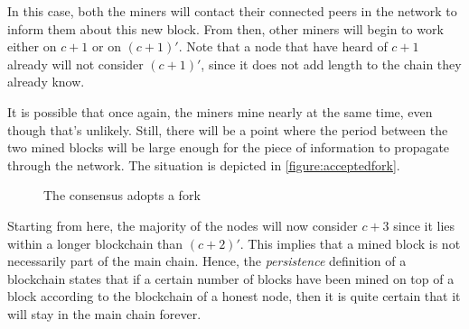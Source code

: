         In this case, both the miners will contact their connected peers in the network to inform them about this new block. From then, other miners will begin to work either on \(c+1\) or on \((c+1)'\). Note that a node that have heard of \(c+1\) already will not consider \((c+1)'\), since it does not add length to the chain they already know.
        
        It is possible that once again, the miners mine nearly at the same time, even though that's unlikely. Still, there will be a point where the period between the two mined blocks will be large enough for the piece of information to propagate through the network. The situation is depicted in \autoref{figure:acceptedfork}.
        
        \begin{figure}[ht]
          \centering
          \caption{The consensus adopts a fork}
          \label{figure:acceptedfork}
        \end{figure}
        
        Starting from here, the majority of the nodes will now consider \(c+3\) since it lies within a longer blockchain than \((c+2)'\). This implies that a mined block is not necessarily part of the main chain. Hence, the \textit{persistence} definition of a blockchain states that if a certain number of blocks have been mined on top of a block according to the blockchain of a honest node, then it is quite certain that it will stay in the main chain forever.
        
